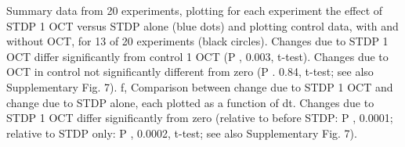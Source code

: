 
  Summary data from 20 experiments, plotting for each experiment the effect of STDP 1 OCT versus STDP alone (blue dots) and plotting control data, with and without OCT, for 13 of 20 experiments (black circles). Changes due to STDP 1 OCT differ significantly from control 1 OCT (P , 0.003, t-test). Changes due to OCT in control not significantly different from zero (P . 0.84, t-test; see also Supplementary Fig. 7). f, Comparison between change due to STDP 1 OCT and change due to STDP alone, each plotted as a function of dt. Changes due to STDP 1 OCT differ significantly from zero (relative to before STDP: P , 0.0001; relative to STDP only:
P , 0.0002, t-test; see also Supplementary Fig. 7).

